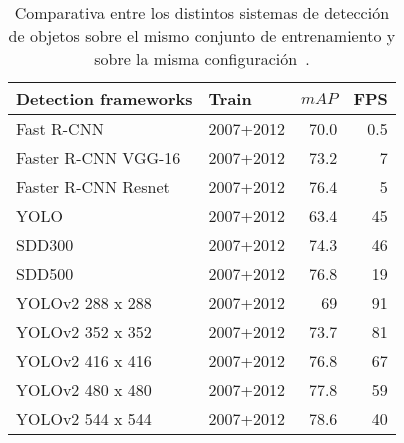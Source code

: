 \begin{table}
  \begin{center}
    \begin{tabular}{@{} l l r r@{}}
      \toprule
        \textbf{Detection frameworks}  & \textbf{Train} & \textbf{$mAP$} & \textbf{FPS} \\
      \midrule
        Fast R-CNN                     & 2007+2012      & 70.0           & 0.5 \\
        Faster R-CNN VGG-16                            & 2007+2012      & 73.2           & 7 \\
      Faster R-CNN Resnet                            & 2007+2012      & 76.4           & 5 \\
      YOLO                            & 2007+2012      & 63.4          & 45 \\
      SDD300                            & 2007+2012      & 74.3           & 46 \\
      SDD500                            & 2007+2012      & 76.8           & 19 \\\hline
      YOLOv2 288 x 288                            & 2007+2012      & 69           & 91 \\
      YOLOv2 352 x 352                            & 2007+2012      & 73.7           & 81 \\
      YOLOv2 416 x 416                            & 2007+2012      & 76.8           & 67 \\
      YOLOv2 480 x 480                            & 2007+2012      & 77.8           & 59 \\
      YOLOv2 544 x 544                            & 2007+2012      & 78.6           & 40 \\
      \bottomrule
    \end{tabular}
    \caption[Comparativa entre los distintos sistemas de detección de objetos]{Comparativa entre los distintos sistemas de detección de objetos sobre el mismo conjunto de entrenamiento y sobre la misma configuración~\cite{yolov2}.}
    \label{tabla:comparativa_yolo}
  \end{center}
\end{table}
